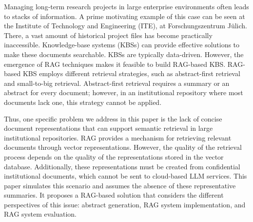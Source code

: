 \documentclass[bdcc,article,submit,pdftex,moreauthors]{Definitions/mdpi}
\newcommand{\commentRed}[1]{\textcolor{red}{#1}}
\begin{document}
Managing long-term research projects in large enterprise environments often leads to stacks of information. A prime motivating example of this case can be seen at the Institute of Technology and Engineering (ITE), at Forschungszentrum Jülich.
There, a vast amount of historical project files has become practically inaccessible.
Knowledge-base systems (KBSs) can provide effective solutions to make these documents searchable.
KBSs are typically data-driven.
However, the emergence of RAG techniques makes it feasible to build RAG-based KBS.
RAG-based KBS employs different retrieval strategies, such as abstract-first retrieval \cite{aytar2024retrieval} and small-to-big retrieval.
Abstract-first retrieval requires a summary or an abstract for every document; however, in an institutional repository where most documents lack one, this strategy cannot be applied.

Thus, one specific problem we address in this paper is the lack of concise document representations that can support semantic retrieval in large institutional repositories.
RAG provides a mechanism for retrieving relevant documents through vector representations. However, the quality of the retrieval process depends on the quality of the representations stored in the vector database. Additionally, these representations must be created from confidential institutional documents, which cannot be sent to cloud-based LLM services.
This paper simulates this scenario and assumes the absence of these representative summaries. It proposes a RAG-based solution that considers the different perspectives of this issue: abstract generation, RAG system implementation, and RAG system evaluation.
\end{document}
